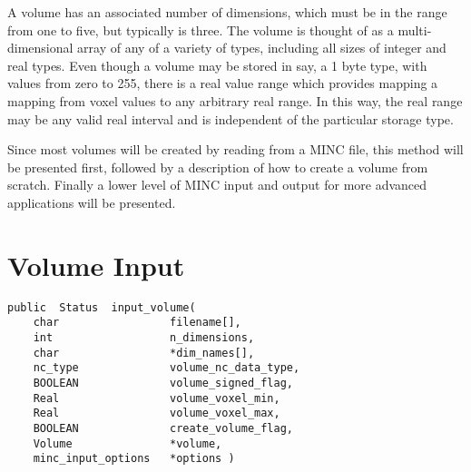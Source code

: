 A volume has an associated number of dimensions, which must be in the range
from one to five, but typically is three.  The volume is thought of as
a multi-dimensional array of any of a variety of types, including all
sizes of integer and real types.  Even though a volume may be
stored in say, a 1 byte type, with values from zero to 255, there is a
real value range which provides mapping a mapping from voxel values 
to any arbitrary real range.  In this way, the real range may be any
valid real interval and is independent of the particular storage type.

Since most volumes will be created by reading from a MINC file, this
method will be presented first, followed by a description of how to
create a volume from scratch.  Finally a lower level of MINC input and
output for more advanced applications will be presented.

\section{Volume Input}

{\bf\begin{verbatim}
public  Status  input_volume(
    char                 filename[],
    int                  n_dimensions,
    char                 *dim_names[],
    nc_type              volume_nc_data_type,
    BOOLEAN              volume_signed_flag,
    Real                 volume_voxel_min,
    Real                 volume_voxel_max,
    BOOLEAN              create_volume_flag,
    Volume               *volume,
    minc_input_options   *options )
\end{verbatim}}


